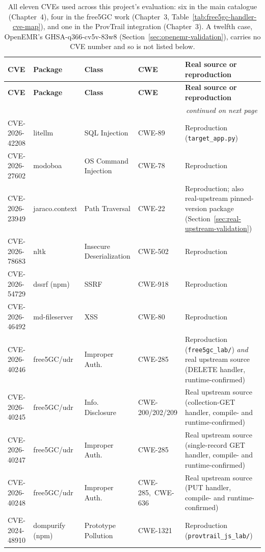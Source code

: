 \documentclass[12pt,a4paper]{report}
\begin{document}
\begin{longtable}{@{}lp{1.9cm}p{2.3cm}lp{4.1cm}@{}}
\caption{All eleven CVEs used across this project's evaluation: six in the main catalogue (Chapter~4), four in the free5GC work (Chapter~3, Table~\ref{tab:free5gc-handler-cve-map}), and one in the ProvTrail integration (Chapter~3). A twelfth case, OpenEMR's GHSA-q366-cv5v-83w8 (Section~\ref{sec:openemr-validation}), carries no CVE number and so is not listed below.}
\label{tab:catalogue} \\
\toprule
\textbf{CVE} & \textbf{Package} & \textbf{Class} & \textbf{CWE} & \textbf{Real source or reproduction} \\
\midrule
\endfirsthead
\toprule
\textbf{CVE} & \textbf{Package} & \textbf{Class} & \textbf{CWE} & \textbf{Real source or reproduction} \\
\midrule
\endhead
\midrule
\multicolumn{5}{r}{\footnotesize\emph{continued on next page}} \\
\endfoot
\bottomrule
\endlastfoot
\mbox{CVE-2026-42208} & litellm & SQL Injection & \mbox{CWE-89} & Reproduction (\texttt{target\_app.py}) \\
\mbox{CVE-2026-27602} & modoboa & OS Command Injection & \mbox{CWE-78} & Reproduction \\
\mbox{CVE-2026-23949} & jaraco.context & Path Traversal & \mbox{CWE-22} & Reproduction; also real-upstream pinned-version package (Section~\ref{sec:real-upstream-validation}) \\
\mbox{CVE-2026-78683} & nltk & Insecure Deserialization & \mbox{CWE-502} & Reproduction \\
\mbox{CVE-2026-54729} & dssrf (npm) & SSRF & \mbox{CWE-918} & Reproduction \\
\mbox{CVE-2026-46492} & md-fileserver & XSS & \mbox{CWE-80} & Reproduction \\
\mbox{CVE-2026-40246} & free5GC/udr & Improper Auth. & \mbox{CWE-285} & Reproduction (\texttt{free5gc\_lab/}) \emph{and} real upstream source (DELETE handler, runtime-confirmed) \\
\mbox{CVE-2026-40245} & free5GC/udr & Info. Disclosure & \mbox{CWE-200/202/209} & Real upstream source (collection-GET handler, compile- and runtime-confirmed) \\
\mbox{CVE-2026-40247} & free5GC/udr & Improper Auth. & \mbox{CWE-285} & Real upstream source (single-record GET handler, compile- and runtime-confirmed) \\
\mbox{CVE-2026-40248} & free5GC/udr & Improper Auth. & \mbox{CWE-285, CWE-636} & Real upstream source (PUT handler, compile- and runtime-confirmed) \\
\mbox{CVE-2024-48910} & dompurify (npm) & Prototype Pollution & \mbox{CWE-1321} & Reproduction (\texttt{provtrail\_js\_lab/}) \\
\end{longtable}
\end{document}
